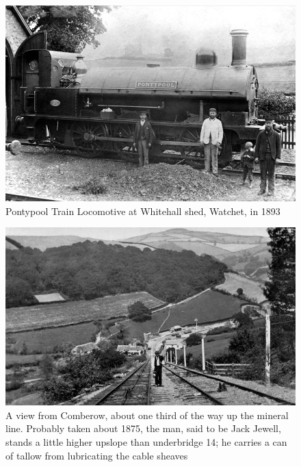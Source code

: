 \begin{figure}
	 \centering
     \includegraphics[width=1\textwidth]{figures/pontypoolWatchet}
     \caption{Pontypool Train Locomotive at Whitehall shed, Watchet, in 1893}
     \label{fig:Pontypool}
\end{figure}

\begin{figure}
	 \centering
     \includegraphics[width=1\textwidth]{figures/inclineTop}
     \caption{A view from Comberow, about one third of the way up the mineral line. Probably taken about 1875, the man, said to be Jack Jewell, stands a little higher upslope than underbridge 14; he carries a can of tallow from lubricating the cable sheaves}
     \label{fig:inclineTop}
\end{figure}

